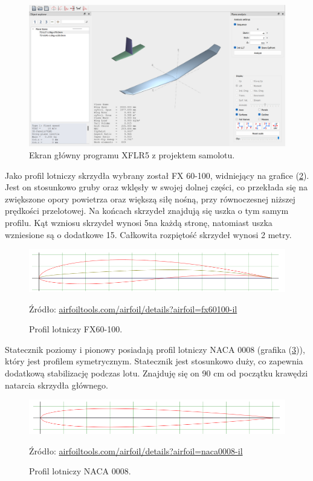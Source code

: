 \documentclass[12pt, a4paper]{article}
\let\oldref\ref
\renewcommand{\ref}[1]{(\oldref{#1})}
\begin{document}
 \begin{figure}[ht]
    \centering
    \includegraphics[width=1\textwidth]{xflr}
    \caption{Ekran główny programu XFLR5 z projektem samolotu.}
    \label{fig:xflr}
\end{figure}

Jako profil lotniczy skrzydła wybrany został FX 60-100, widniejący na grafice \ref{fig:fx60}. Jest on stosunkowo gruby oraz wklęsły w swojej dolnej części, co przekłada się na zwiększone opory powietrza oraz większą siłę nośną, przy równoczesnej niższej prędkości przelotowej. Na końcach skrzydeł znajdują się uszka o tym samym profilu. Kąt wzniosu skrzydeł wynosi 5\textdegree na każdą stronę, natomiast uszka wzniesione są o dodatkowe 15\textdegree.  Całkowita rozpiętość skrzydeł wynosi 2 metry.

 \begin{figure}[ht]
    \centering
    \includegraphics[width=1\textwidth]{fx60}
    \caption{Profil lotniczy FX60-100.}
    \small Źródło: \url{airfoiltools.com/airfoil/details?airfoil=fx60100-il}
    \label{fig:fx60}
\end{figure}

Statecznik poziomy i pionowy posiadają profil lotniczy NACA 0008 (grafika \ref{fig:naca}), który jest profilem symetrycznym. Statecznik jest stosunkowo duży, co zapewnia dodatkową stabilizację podczas lotu. Znajduję się on 90 cm od początku krawędzi natarcia skrzydła głównego.

 \begin{figure}[ht]
    \centering
    \includegraphics[width=1\textwidth]{naca0008}
    \caption{Profil lotniczy NACA 0008.}
    \small Źródło: \url{airfoiltools.com/airfoil/details?airfoil=naca0008-il}
    \label{fig:naca}
\end{figure}
\end{document}
